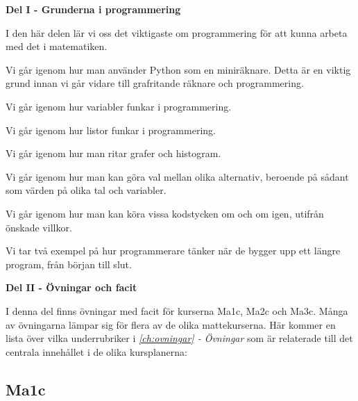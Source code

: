 
\vspace{20pt}
{\large{\textbf{Del I - Grunderna i programmering}}}

I den här delen lär vi oss det viktigaste om programmering för att kunna arbeta med det i matematiken.
\vspace{10pt}
\begin{addmargin}[1.7em]{1.7em}%


Vi går igenom hur man använder Python som en miniräknare. Detta är en viktig grund innan vi går vidare till grafritande räknare och programmering.


Vi går igenom hur variabler funkar i programmering.


Vi går igenom hur listor funkar i programmering.


Vi går igenom hur man ritar grafer och histogram.


Vi går igenom hur man kan göra val mellan olika alternativ, beroende på sådant som värden på olika tal och variabler.


Vi går igenom hur man kan köra vissa kodstycken om och om igen, utifrån önskade villkor.


Vi tar två exempel på hur programmerare tänker när de bygger upp ett längre program, från början till slut.

\end{addmargin}
\newpage
{\large{\textbf{Del II - Övningar och facit}}}

I denna del finns övningar med facit för kurserna Ma1c, Ma2c och Ma3c. Många av övningarna lämpar sig för flera av de olika mattekurserna. Här kommer en lista över vilka underrubriker i \emph{\autoref{ch:ovningar} - Övningar} som är relaterade till det centrala innehållet i de olika kursplanerna:

\subsection*{Ma1c}

